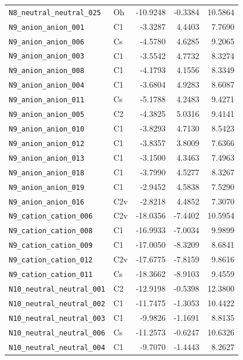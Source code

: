 {\begin{longtable}{@{}p{4.6cm}p{1.6cm}rrr@{}}
\texttt{N8\_neutral\_neutral\_025} & Oh & -10.9248 & -0.3384 & 10.5864 \\
\addlinespace
\texttt{N9\_anion\_anion\_001} & C1 & -3.3287 & 4.4403 & 7.7690 \\
\texttt{N9\_anion\_anion\_006} & Cs & -4.5780 & 4.6285 & 9.2065 \\
\texttt{N9\_anion\_anion\_003} & C1 & -3.5542 & 4.7732 & 8.3274 \\
\texttt{N9\_anion\_anion\_008} & C1 & -4.1793 & 4.1556 & 8.3349 \\
\texttt{N9\_anion\_anion\_004} & C1 & -3.6804 & 4.9283 & 8.6087 \\
\texttt{N9\_anion\_anion\_011} & Cs & -5.1788 & 4.2483 & 9.4271 \\
\texttt{N9\_anion\_anion\_005} & C2 & -4.3825 & 5.0316 & 9.4141 \\
\texttt{N9\_anion\_anion\_010} & C1 & -3.8293 & 4.7130 & 8.5423 \\
\texttt{N9\_anion\_anion\_012} & C1 & -3.8357 & 3.8009 & 7.6366 \\
\texttt{N9\_anion\_anion\_013} & C1 & -3.1500 & 4.3463 & 7.4963 \\
\texttt{N9\_anion\_anion\_018} & C1 & -3.7990 & 4.5277 & 8.3267 \\
\texttt{N9\_anion\_anion\_019} & C1 & -2.9452 & 4.5838 & 7.5290 \\
\texttt{N9\_anion\_anion\_016} & C2v & -2.8218 & 4.4852 & 7.3070 \\
\texttt{N9\_cation\_cation\_006} & C2v & -18.0356 & -7.4402 & 10.5954 \\
\texttt{N9\_cation\_cation\_008} & C1 & -16.9933 & -7.0034 & 9.9899 \\
\texttt{N9\_cation\_cation\_009} & C1 & -17.0050 & -8.3209 & 8.6841 \\
\texttt{N9\_cation\_cation\_012} & C2v & -17.6775 & -7.8159 & 9.8616 \\
\texttt{N9\_cation\_cation\_011} & Cs & -18.3662 & -8.9103 & 9.4559 \\
\addlinespace
\texttt{N10\_neutral\_neutral\_001} & C2 & -12.9198 & -0.5398 & 12.3800 \\
\texttt{N10\_neutral\_neutral\_002} & C1 & -11.7475 & -1.3053 & 10.4422 \\
\texttt{N10\_neutral\_neutral\_003} & C1 & -9.9826 & -1.1691 & 8.8135 \\
\texttt{N10\_neutral\_neutral\_006} & Cs & -11.2573 & -0.6247 & 10.6326 \\
\texttt{N10\_neutral\_neutral\_004} & C1 & -9.7070 & -1.4443 & 8.2627 \\

\end{longtable}}
